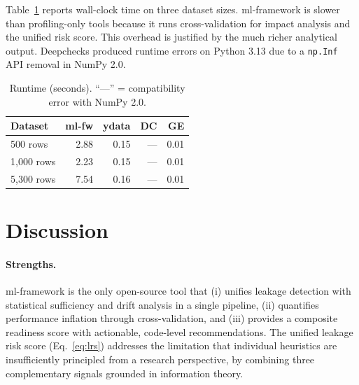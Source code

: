 \documentclass[11pt]{article}
\begin{document}
Table~\ref{tab:runtime} reports wall-clock time on three dataset sizes.
ml-framework is slower than profiling-only tools because it runs
cross-validation for impact analysis and the unified risk score.  This
overhead is justified by the much richer analytical output.  Deepchecks
produced runtime errors on Python 3.13 due to a \texttt{np.Inf} API removal
in NumPy 2.0.

\begin{table}[!h]
\centering
\caption{Runtime (seconds). ``---'' = compatibility error with NumPy 2.0.}
\label{tab:runtime}
\scriptsize
\begin{tabular}{lrrrr}
\toprule
\textbf{Dataset} & \textbf{ml-fw} & \textbf{ydata} & \textbf{DC} & \textbf{GE} \\
\midrule
500 rows   & 2.88 & 0.15 & --- & 0.01 \\
1{,}000 rows & 2.23 & 0.15 & --- & 0.01 \\
5{,}300 rows & 7.54 & 0.16 & --- & 0.01 \\
\bottomrule
\end{tabular}
\end{table}

\section{Discussion}
\label{sec:discussion}

\paragraph{Strengths.}
ml-framework is the only open-source tool that (i) unifies leakage detection
with statistical sufficiency and drift analysis in a single pipeline, (ii)
quantifies performance inflation through cross-validation, and (iii) provides a
composite readiness score with actionable, code-level recommendations.  The
unified leakage risk score (Eq.~\ref{eq:lrs}) addresses the limitation that
individual heuristics are insufficiently principled from a research perspective,
by combining three complementary signals grounded in information theory.
\end{document}
